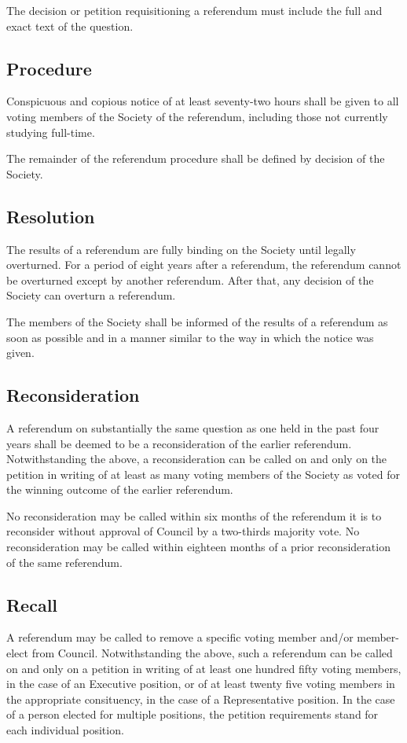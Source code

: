 The decision or petition requisitioning a referendum must include the full and
exact text of the question.

\subsection{Procedure}
Conspicuous and copious notice of at least seventy-two hours shall be given to
all voting members of the Society of the referendum, including those not
currently studying full-time.

The remainder of the referendum procedure shall be defined by decision of the
Society.

\subsection{Resolution}
The results of a referendum are fully binding on the Society until legally
overturned. For a period of eight years after a referendum, the referendum
cannot be overturned except by another referendum. After that, any decision of
the Society can overturn a referendum.

The members of the Society shall be informed of the results of a referendum as
soon as possible and in a manner similar to the way in which the notice was
given.

\subsection{Reconsideration}
A referendum on substantially the same question as one held in the past four
years shall be deemed to be a reconsideration of the earlier referendum.
Notwithstanding the above, a reconsideration can be called on and only on the
petition in writing of at least as many voting members of the Society as voted
for the winning outcome of the earlier referendum.

No reconsideration may be called within six months of the referendum it is to
reconsider without approval of Council by a two-thirds majority vote. No
reconsideration may be called within eighteen months of a prior reconsideration
of the same referendum.

\subsection{Recall}
A referendum may be called to remove a specific voting member and/or member-elect
from Council. Notwithstanding the above, such a referendum can be called on and
only on a petition in writing of at least one hundred fifty voting members, in
the case of an Executive position, or of at least twenty five voting members in
the appropriate consituency, in the case of a Representative position. In the
case of a person elected for multiple positions, the petition requirements stand
for each individual position.

